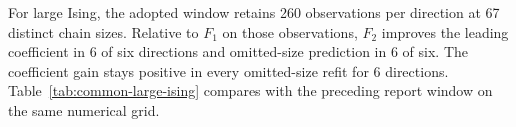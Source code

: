 For large Ising, the adopted window retains 260 observations per direction at 67 distinct chain sizes. Relative to $F_1$ on those observations, $F_2$ improves the leading coefficient in 6 of six directions and omitted-size prediction in 6 of six. The coefficient gain stays positive in every omitted-size refit for 6 directions. Table~\ref{tab:common-large-ising} compares with the preceding report window on the same numerical grid.
